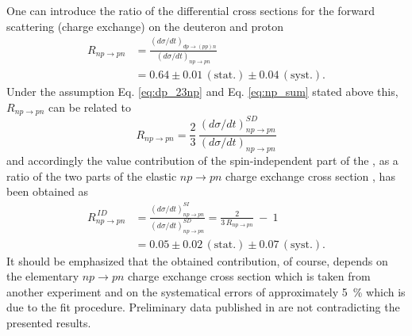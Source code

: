 \documentclass[twocolumn,epjc3]{svjour3}
\newcommand{\np}     {\ensuremath{np \rightarrow pn}\xspace}
\newcommand{\dpchex} {\ensuremath{dp \rightarrow (pp)n}\xspace}
\providecommand{\DIFaddtex}[1]{{\protect\color{Green} \sf #1}} %
\providecommand{\DIFdeltex}[1]{{\protect\color{Red} \scriptsize #1}} %
\providecommand{\DIFaddbegin}{} %
\providecommand{\DIFaddend}{} %
\providecommand{\DIFdelbegin}{} %
\providecommand{\DIFdelend}{} %
\providecommand{\DIFadd}[1]{\texorpdfstring{\DIFaddtex{#1}}{#1}} %
\providecommand{\DIFdel}[1]{\texorpdfstring{\DIFdeltex{#1}}{}} %
\newcommand{\DIFscaledelfig}{0.5}
\newlength{\DIFdelgraphicswidth} %
\newlength{\DIFdelgraphicsheight} %
\newcommand{\DIFaddincludegraphics}[2][]{{\color{blue}\fbox{\DIFOincludegraphics[#1]{#2}}}} %
\newcommand{\DIFdelincludegraphics}[2][]{%
\sbox{\DIFdelgraphicsbox}{\DIFOincludegraphics[#1]{#2}}%
\settoboxwidth{\DIFdelgraphicswidth}{\DIFdelgraphicsbox} %
\settoboxtotalheight{\DIFdelgraphicsheight}{\DIFdelgraphicsbox} %
\scalebox{\DIFscaledelfig}{%
\parbox[b]{\DIFdelgraphicswidth}{\usebox{\DIFdelgraphicsbox}\\[-\baselineskip] \rule{\DIFdelgraphicswidth}{0em}}\llap{\resizebox{\DIFdelgraphicswidth}{\DIFdelgraphicsheight}{%
\setlength{\unitlength}{\DIFdelgraphicswidth}%
\begin{picture}(1,1)%
\thicklines\linethickness{2pt} %
{\color[rgb]{1,0,0}\put(0,0){\framebox(1,1){}}}%
{\color[rgb]{1,0,0}\put(0,0){\line( 1,1){1}}}%
{\color[rgb]{1,0,0}\put(0,1){\line(1,-1){1}}}%
\end{picture}%
}\hspace*{3pt}}} %
} %
\DeclareRobustCommand{\DIFaddbegin}{\DIFOaddbegin \let\includegraphics\DIFaddincludegraphics} %
\DeclareRobustCommand{\DIFaddend}{\DIFOaddend \let\includegraphics\DIFOincludegraphics} %
\DeclareRobustCommand{\DIFdelbegin}{\DIFOdelbegin \let\includegraphics\DIFdelincludegraphics} %
\DeclareRobustCommand{\DIFdelend}{\DIFOaddend \let\includegraphics\DIFOincludegraphics} %
\begin{document}
One can introduce the ratio of the differential cross sections for the forward
scattering (charge exchange) on the deuteron and proton
\begin{equation}
  \begin{split}
    R_{\np} &= \frac{(d\sigma/dt)_{\dpchex}}{(d\sigma/dt)_{\np}} \\
    &= 0.64 \pm 0.01\,\mathrm{(stat.)} \pm 0.04\,\mathrm{(syst.)}.
  \end{split}
\end{equation}
Under the assumption Eq. \eqref{eq:dp_23np} and Eq. \eqref{eq:np_sum} stated
above this, $R_{\np}$ can be related to
\begin{equation}
  R_{\np} = \frac{2}{3}\,\frac{(d\sigma/dt)^{SD}_{\np}}{(d\sigma/dt)_{\np}}
\end{equation}
and accordingly the \DIFdelbegin \DIFdel{value }\DIFdelend \DIFaddbegin \DIFadd{contribution }\DIFaddend of the spin-independent part\DIFdelbegin \DIFdel{of the }\DIFdelend \DIFaddbegin \DIFadd{, as a ratio of the
two parts of the }\DIFaddend elastic \np charge exchange cross section\DIFaddbegin \DIFadd{, }\DIFaddend has been obtained as
\begin{equation}
  \begin{split}
    R^{\,ID}_{\np} &= \frac{(d\sigma/dt)^{SI}_{\np}}{(d\sigma/dt)^{SD}_{\np}}
    = \frac{2}{3\,R_{\np}} \ - \ 1 \\
    &= 0.05 \pm 0.02\,\mathrm{(stat.)} \pm 0.07\,\mathrm{(syst.)}.
  \end{split}
\end{equation}
It should be emphasized that the obtained contribution, of course, depends on
the elementary \np charge exchange cross section which is taken from another
experiment and on the systematical errors of approximately 5~\% which is due to
the fit procedure. Preliminary data published in \cite{bas14,bas16} are not
contradicting the presented results.
\end{document}
